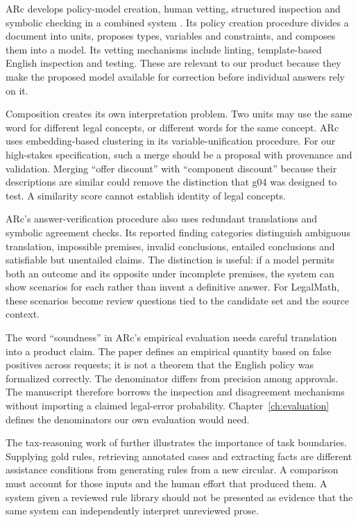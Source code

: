 \documentclass[12pt,a4paper,oneside,openany]{book}
\begin{document}
ARc develops policy-model creation, human vetting, structured inspection and
symbolic checking in a combined system \citep[sec.~3 and appendix A]{arc2025}.
Its policy creation procedure divides a document into units, proposes types,
variables and constraints, and composes them into a model. Its vetting
mechanisms include linting, template-based English inspection and testing.
These are relevant to our product because they make the proposed model
available for correction before individual answers rely on it.

Composition creates its own interpretation problem. Two units may use the same
word for different legal concepts, or different words for the same concept.
ARc uses embedding-based clustering in its variable-unification procedure.
For our high-stakes specification, such a merge should be a proposal with
provenance and validation. Merging ``offer discount'' with ``component
discount'' because their descriptions are similar could remove the distinction
that g04 was designed to test. A similarity score cannot establish identity
of legal concepts.

ARc's answer-verification procedure also uses redundant translations and
symbolic agreement checks. Its reported finding categories distinguish
ambiguous translation, impossible premises, invalid conclusions, entailed
conclusions and satisfiable but unentailed claims. The distinction is useful:
if a model permits both an outcome and its opposite under incomplete premises,
the system can show scenarios for each rather than invent a definitive answer.
For LegalMath, these scenarios become review questions tied to the candidate
set and the source context.

The word ``soundness'' in ARc's empirical evaluation needs careful translation
into a product claim. The paper defines an empirical quantity based on false
positives across requests; it is not a theorem that the English policy was
formalized correctly. The denominator differs from precision among approvals.
The manuscript therefore borrows the inspection and disagreement mechanisms
without importing a claimed legal-error probability. Chapter~\ref{ch:evaluation}
defines the denominators our own evaluation would need.

The tax-reasoning work of \citet{jurayj2026} further illustrates the importance
of task boundaries. Supplying gold rules, retrieving annotated cases and
extracting facts are different assistance conditions from generating rules
from a new circular. A comparison must account for those inputs and the human
effort that produced them. A system given a reviewed rule library should not
be presented as evidence that the same system can independently interpret
unreviewed prose.
\end{document}
